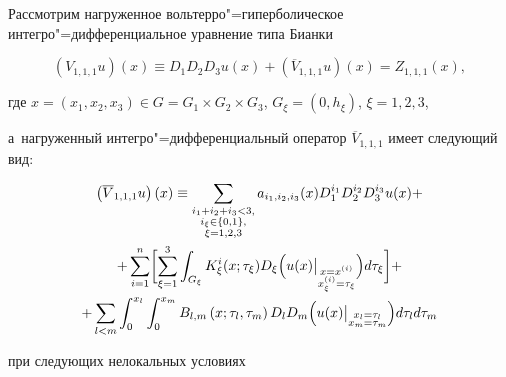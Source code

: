 Рассмотрим нагруженное вольтерро"=гиперболическое интегро"=дифференциальное уравнение типа Бианки

\begin{equation} \label{mam:1}

( V_{1, 1, 1}u ) (x) \equiv D_1 D_2 D_3 u(x)+(\overline{V}_{1, 1, 1}u) (x)= Z_{1, 1, 1}(x),  

\end{equation}

где $x = (x_1 ,x_2 ,x_3 ) \in G = G_1  \times G_2  \times G_3 $, $G_\xi  =(0, h_\xi  )$, $\xi =1, 2, 3$, 

а~нагруженный интегро"=дифференциальный оператор $\overline{V}_{1,1,1}$ имеет следующий вид:

\begin{multline*}

\left( \overline{V}_{1, 1, 1}u\right) (x) \equiv

\sum\limits_{\substack{ i_1 +i_2 +i_3 <3, \\ i_\xi \in\{0, 1\}, \\ \xi =1, 2, 3}}a_{i_1 ,i_2 ,i_3 }(x)

D_1 ^{i_1 }D_2 ^{i_2 }D_3 ^{i_3 }u(x) +

\\

+\sum\limits_{i=1}^{n}\biggl[ \sum\limits_{\xi =1}^{3}

\int_{G_\xi }K_\xi ^{i}( x; \tau _\xi  ) D_{\xi

}\Bigl( u(x) \big\vert _{\substack{ x=x^{(i)} \\ x_\xi ^{(i)}=\tau

_\xi }}\Bigr)d\tau _\xi \biggr] +

\\

+\sum\limits_{l<m}

\int_{0}^{x_{l}}\int_{0}^{x_{m}}B_{l,m}\left( x;\tau _{l},\tau

_{m}\right) D_{l}D_{m}\Bigl(u(x)\big\vert _{\substack{ x_{l}=\tau _{l} \\ %

x_{m}=\tau _{m}}}\Bigr)d\tau _{l}d\tau _{m}

\end{multline*}





при следующих нелокальных условиях


